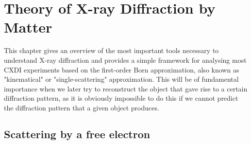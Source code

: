\chapter{Theory of X-ray Diffraction by Matter}\label{diffraction_theory}\noindent

This chapter gives an overview of the most important tools necessary to
understand X-ray diffraction and provides a simple framework for analysing most
CXDI experiments based on the first-order Born approximation, also known as
"kinematical" or "single-scattering" approximation. This will be of fundamental
importance when we later try to reconstruct the object that gave rise to a certain
diffraction pattern, as  it is obviously impossible to do this if we cannot
predict the diffraction pattern that a given object produces.

\section{Scattering by a free electron}\label{scat_free_electron}

